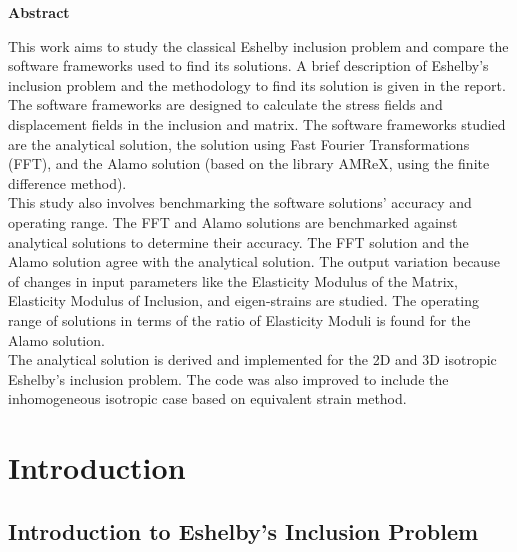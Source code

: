 \documentclass[12pt, a4paper]{report}
\begin{document}
\cleardoublepage
\thispagestyle{empty}
\addtocounter{page}{-1}%
\mbox{}

\newpage
\begin{center}
    \Huge \textbf{Abstract}
\end{center}
\vspace{0.5cm}

This work aims to study the classical Eshelby inclusion problem and compare the software frameworks used to find its solutions. A brief description of Eshelby’s inclusion problem and the methodology to find its solution is given in the report. The software frameworks are designed to calculate the stress fields and displacement fields in the inclusion and matrix. The software frameworks studied are the analytical solution, the solution using Fast Fourier Transformations (FFT), and the Alamo solution (based on the library AMReX, using the finite difference method). \\

This study also involves benchmarking the software solutions' accuracy and operating range. The FFT and Alamo solutions are benchmarked against analytical solutions to determine their accuracy. The FFT solution and the Alamo solution agree with the analytical solution. The output variation because of changes in input parameters like the Elasticity Modulus of the Matrix, Elasticity Modulus of Inclusion, and eigen-strains are studied. The operating range of solutions in terms of the ratio of Elasticity Moduli is found for the Alamo solution. \\

The analytical solution is derived and implemented for the 2D and 3D isotropic Eshelby's inclusion problem. The code was also improved to include the inhomogeneous isotropic case based on equivalent strain method.

\cleardoublepage
\thispagestyle{empty}
\addtocounter{page}{-1}%
\mbox{}

\tableofcontents

\cleardoublepage
\thispagestyle{empty}
\addtocounter{page}{-1}%
\mbox{}

\listoftables

\listoffigures

\newpage
{}

\chapter{Introduction}
\section{Introduction to Eshelby's Inclusion Problem} 
\end{document}
